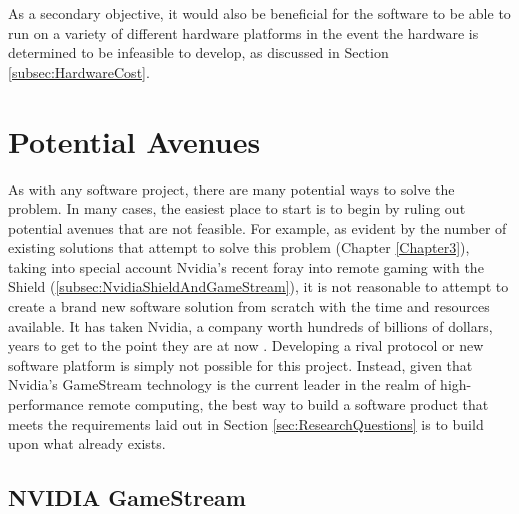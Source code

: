 As a secondary objective, it would also be beneficial for the software to be able to run on a variety of different hardware platforms in the event the hardware is determined to be infeasible to develop, as discussed in Section \ref{subsec:HardwareCost}.


\section{Potential Avenues}\label{sec:PotentialAvenues}

As with any software project, there are many potential ways to solve the problem.
In many cases, the easiest place to start is to begin by ruling out potential avenues that are not feasible.
For example, as evident by the number of existing solutions that attempt to solve this problem (Chapter \ref{Chapter3}), taking into special account Nvidia's recent foray into remote gaming with the Shield (\ref{subsec:NvidiaShieldAndGameStream}), it is not reasonable to attempt to create a brand new software solution from scratch with the time and resources available.
It has taken Nvidia, a company worth hundreds of billions of dollars, years to get to the point they are at now \cite{brown_2013}.
Developing a rival protocol or new software platform is simply not possible for this project.
Instead, given that Nvidia's GameStream technology is the current leader in the realm of high-performance remote computing, the best way to build a software product that meets the requirements laid out in Section \ref{sec:ResearchQuestions} is to build upon what already exists.


\subsection{NVIDIA GameStream}\label{subsec:NVIDIAGameStream}


